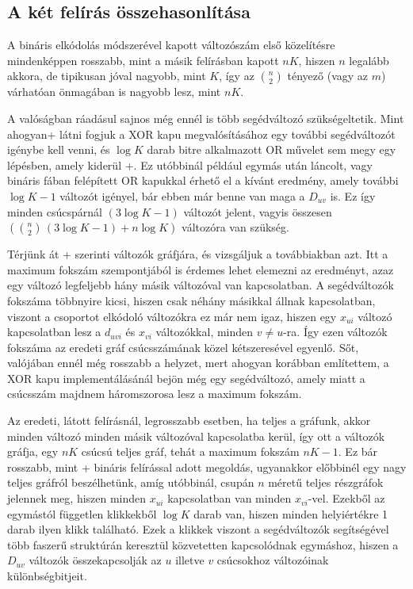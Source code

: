 \subsection{A két felírás összehasonlítása}\label{sec:theoryonehotVSbinary}

A bináris elkódolás módszerével kapott változószám első közelítésre mindenképpen rosszabb, mint a másik felírásban kapott $nK$, hiszen $n$ legalább akkora, de tipikusan jóval nagyobb, mint $K$, így az $\binom{n}{2}$ tényező (vagy az $m$) várhatóan önmagában is nagyobb lesz, mint $nK$.

A valóságban ráadásul sajnos még ennél is több segédváltozó szükségeltetik. Mint ahogyan\az+ látni fogjuk a XOR kapu megvalósításához egy további segédváltozót igénybe kell venni, és $\log K$ darab bitre alkalmazott OR művelet sem megy egy lépésben, amely kiderül \az+. Ez utóbbinál például egymás után láncolt, vagy bináris fában felépített OR kapukkal érhető el a kívánt eredmény, amely további $\log K -1$ változót igényel, bár ebben már benne van maga a $D_{uv}$ is. Ez így minden csúcspárnál $(3\log K - 1)$ változót jelent, vagyis összesen $\left(\binom{n}{2} \, (3\log K -  1 ) + n \log K\right)$ változóra van szükség.
 
Térjünk át \az+ szerinti változók gráfjára, és vizsgáljuk a továbbiakban azt.
Itt a maximum fokszám szempontjából is érdemes lehet elemezni az eredményt, azaz egy változó legfeljebb hány másik változóval van kapcsolatban. A segédváltozók fokszáma többnyire kicsi, hiszen csak néhány másikkal állnak kapcsolatban, viszont a csoportot elkódoló változókra ez már nem igaz, hiszen egy $x_{ui}$ változó kapcsolatban lesz a $d_{uvi}$ és $x_{vi}$ változókkal, minden $v \neq u$-ra. Így ezen változók fokszáma az eredeti gráf csúcsszámának közel kétszeresével egyenlő. Sőt, valójában ennél még rosszabb a helyzet, mert ahogyan korábban említettem, a XOR kapu implementálásánál bejön még egy segédváltozó, amely miatt a csúcsszám majdnem háromszorosa lesz a maximum fokszám.

 
Az eredeti,  látott felírásnál, legrosszabb esetben, ha teljes a gráfunk, akkor minden változó minden másik változóval kapcsolatba kerül, így ott a változók gráfja, egy $nK$ csúcsú teljes gráf, tehát a maximum fokszám  $nK -1$. Ez bár rosszabb, mint \az+ bináris felírással adott megoldás, ugyanakkor előbbinél egy nagy teljes gráfról beszélhetünk, amíg utóbbinál, csupán $n$ méretű teljes részgráfok jelennek meg, hiszen minden $x_{ui}$ kapcsolatban van minden $x_{vi}$-vel. Ezekből az egymástól független klikkekből $\log K$ darab van, hiszen minden helyiértékre 1 darab ilyen klikk található. Ezek a klikkek viszont a segédváltozók segítségével több faszerű struktúrán keresztül közvetetten kapcsolódnak egymáshoz, hiszen a $D_{uv}$ változók összekapcsolják az $u$ illetve $v$ csúcsokhoz változóinak különbségbitjeit.

